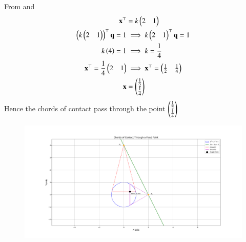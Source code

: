 \documentclass[journal]{IEEEtran}
\begin{document}
From  and  
\begin{align}
    \mathbf{x}^\top&=k\begin{pmatrix}2&1\end{pmatrix}\\
    \left(k\begin{pmatrix}2&1\end{pmatrix}\right)^\top\mathbf{q}=1&\implies
    k\begin{pmatrix}2&1\end{pmatrix}^\top\mathbf{q}=1\\
    k\left(4\right)=1 &\implies k=\frac{1}{4}\\
    \mathbf{x}^\top=\frac{1}{4}\begin{pmatrix}2&1\end{pmatrix} &\implies \mathbf{x}^\top=\begin{pmatrix}\frac{1}{2}&\frac{1}{4}\end{pmatrix}\\
    \mathbf{x}&=\begin{pmatrix}\frac{1}{2}\\\frac{1}{4}\end{pmatrix}
\end{align}
Hence the chords of contact pass through the point  $\begin{pmatrix}\frac{1}{2}\\\frac{1}{4}\end{pmatrix}$
\begin{figure}[h!]
   \centering
   \includegraphics[width=0.9\columnwidth]{figs/fig1.png}
	\caption{}
   \label{}
\end{figure}
\end{document}
